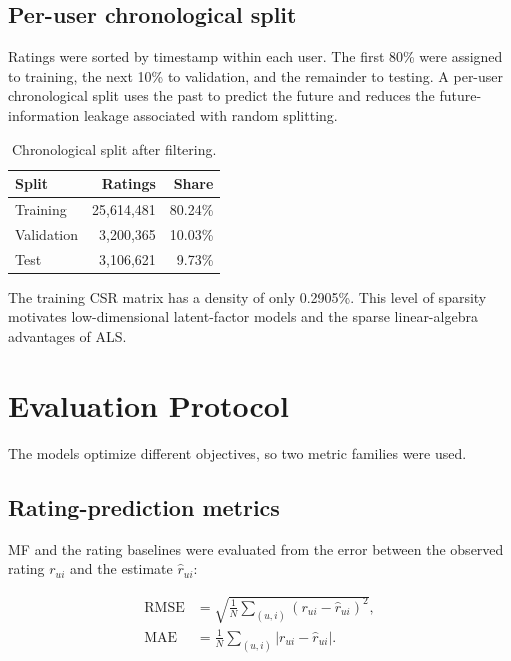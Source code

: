 \documentclass[11pt,a4paper]{article}
\begin{document}
\subsection{Per-user chronological split}

Ratings were sorted by timestamp within each user. The first 80\% were assigned to training, the next 10\% to validation, and the remainder to testing. A per-user chronological split uses the past to predict the future and reduces the future-information leakage associated with random splitting.

\begin{table}[H]
\centering
\caption{Chronological split after filtering.}
\label{tab:split}
\begin{tabular}{@{}lrr@{}}
\toprule
\textbf{Split} & \textbf{Ratings} & \textbf{Share} \\
\midrule
Training & 25,614,481 & 80.24\% \\
Validation & 3,200,365 & 10.03\% \\
Test & 3,106,621 & 9.73\% \\
\bottomrule
\end{tabular}
\end{table}

The training CSR matrix has a density of only 0.2905\%. This level of sparsity motivates low-dimensional latent-factor models and the sparse linear-algebra advantages of ALS.

\section{Evaluation Protocol}

The models optimize different objectives, so two metric families were used.

\subsection{Rating-prediction metrics}

MF and the rating baselines were evaluated from the error between the observed rating $r_{ui}$ and the estimate $\hat r_{ui}$:

\begin{align}
\mathrm{RMSE} &= \sqrt{\frac{1}{N}\sum_{(u,i)}(r_{ui}-\hat r_{ui})^2},\\
\mathrm{MAE}  &= \frac{1}{N}\sum_{(u,i)}\left|r_{ui}-\hat r_{ui}\right|.
\end{align}
\end{document}
